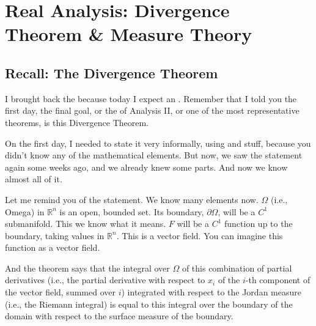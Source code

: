 \chapter{Real Analysis: Divergence Theorem \& Measure Theory}

\section{Recall: The Divergence Theorem}

\begin{spoken-clean}[00:00:00 - 00:01:50]
I brought back the  because today I expect an . Remember that I told you the first day, the final goal, or the  of Analysis II, or one of the most representative theorems, is this Divergence Theorem.

On the first day, I needed to state it very informally, using  and stuff, because you didn't know any of the mathematical elements. But now, we saw the statement again some weeks ago, and we already knew some parts. And now we know almost all of it.

Let me remind you of the statement. We know many elements now. $\Omega$ (i.e., Omega) in $\mathbb{R}^n$ is an open, bounded set. Its boundary, $\partial\Omega$, will be a $C^1$ submanifold. This we know what it means. $F$ will be a $C^1$ function up to the boundary, taking values in $\mathbb{R}^n$. This is a vector field. You can imagine this function as a vector field.

And the theorem says that the integral over $\Omega$ of this combination of partial derivatives (i.e., the partial derivative with respect to $x_i$ of the $i$-th component of the vector field, summed over $i$) integrated with respect to the Jordan measure (i.e., the Riemann integral) is equal to this integral over the boundary of the domain with respect to the surface measure of the boundary.
\end{spoken-clean}

